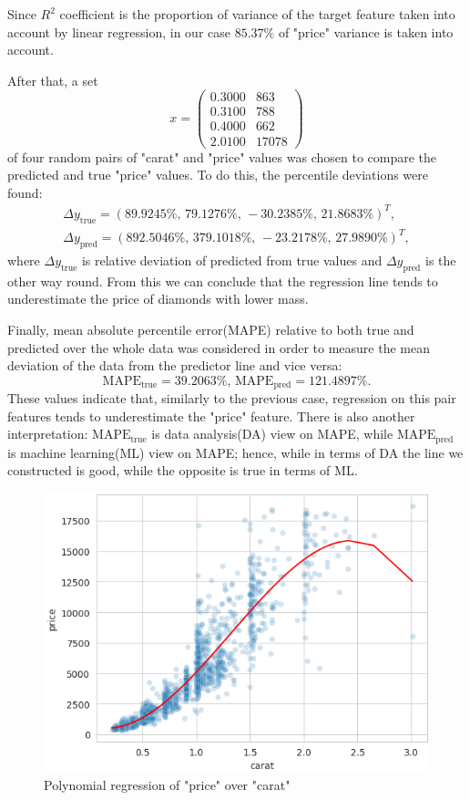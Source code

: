 \documentclass[12pt,a4paper]{article}
\begin{document}
	\newpage
	
	Since $R^2$ coefficient is the proportion of variance of the target feature taken into account by linear regression, in our case  $85.37\%$ of "price" variance is taken into account.
	
	After that, a set 
	\[x=\begin{pmatrix}
			0.3000 & 863\\
			0.3100 & 788\\
			0.4000 & 662\\ 
			2.0100 & 17078
		\end{pmatrix}\]
	of four random pairs of "carat" and "price" values was chosen to compare the predicted and true "price" values. To do this, the percentile deviations were found:
	\begin{multline*}
	\Delta{}y_{\text{true}} = \left(89.9245\%,\, 79.1276\%,\, -30.2385\%,\, 21.8683\%\right)^T,\\ \Delta{}y_{\text{pred}}=\left(892.5046\%,\, 379.1018\%,\, -23.2178\%,\, 27.9890\%\right)^T,
	\end{multline*}
	where $\Delta{}y_{\text{true}}$ is relative deviation of predicted from true values and $\Delta{}y_{\text{pred}}$ is the other way round. From this we can conclude that the regression line tends to underestimate the price of diamonds with lower mass.
	
	Finally, mean absolute percentile error(MAPE) relative to both true and predicted over the whole data was considered in order to measure the mean deviation of the data from the predictor line and vice versa:
	\[\text{MAPE}_{\text{true}}= 39.2063\%,\, \text{MAPE}_{\text{pred}}=121.4897\%.\]
	These values indicate that, similarly to the previous case, regression on this pair features tends to underestimate the "price" feature. There is also another interpretation: $\text{MAPE}_{\text{true}}$ is data analysis(DA) view on MAPE, while $\text{MAPE}_{\text{pred}}$ is machine learning(ML) view on MAPE; hence, while in terms of DA the line we constructed is good, while the opposite is true in terms of ML.
	
	\begin{figure}[h]
		\centering
		\includegraphics[width=.56\textwidth]{media/caratVpriceRegAlt.png}
		\caption{Polynomial regression of "price" over "carat"}
		\label{fig:caratVpriceRegAlt}
	\end{figure}
	
\end{document}
